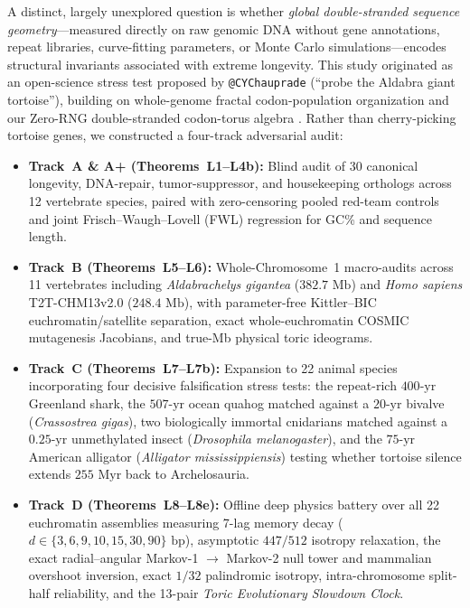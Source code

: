 \documentclass[11pt,a4paper]{article}
\renewcommand{\_}{\origunderscore\penalty200\relax}
\theoremstyle{remark}
\begin{document}
A distinct, largely unexplored question is whether \emph{global double-stranded sequence geometry}---measured directly on raw genomic DNA without gene annotations, repeat libraries, curve-fitting parameters, or Monte Carlo simulations---encodes structural invariants associated with extreme longevity.
This study originated as an open-science stress test proposed by \texttt{@CY\_Chauprade} (``probe the Aldabra giant tortoise''), building on whole-genome fractal codon-population organization \cite{Perez2010} and our Zero-RNG double-stranded codon-torus algebra \cite{LogvinovichPerez2026a,LogvinovichPerez2026b}.
Rather than cherry-picking tortoise genes, we constructed a four-track adversarial audit:
\begin{itemize}
  \item \textbf{Track~A \& A+ (Theorems~L1--L4b):} Blind audit of 30 canonical longevity, DNA-repair, tumor-suppressor, and housekeeping orthologs across 12 vertebrate species, paired with zero-censoring pooled red-team controls and joint Frisch--Waugh--Lovell (FWL) regression for GC\% and sequence length.
  \item \textbf{Track~B (Theorems~L5--L6):} Whole-Chromosome~1 macro-audits across 11 vertebrates including \textit{Aldabrachelys gigantea} ($382.7\text{ Mb}$) and \textit{Homo sapiens} T2T-CHM13v2.0 ($248.4\text{ Mb}$), with parameter-free Kittler--BIC euchromatin/satellite separation, exact whole-euchromatin COSMIC mutagenesis Jacobians, and true-Mb physical toric ideograms.
  \item \textbf{Track~C (Theorems~L7--L7b):} Expansion to 22 animal species incorporating four decisive falsification stress tests: the repeat-rich $400\text{-yr}$ Greenland shark, the $507\text{-yr}$ ocean quahog matched against a $20\text{-yr}$ bivalve (\textit{Crassostrea gigas}), two biologically immortal cnidarians matched against a $0.25\text{-yr}$ unmethylated insect (\textit{Drosophila melanogaster}), and the $75\text{-yr}$ American alligator (\textit{Alligator mississippiensis}) testing whether tortoise silence extends $255\text{ Myr}$ back to Archelosauria.
  \item \textbf{Track~D (Theorems~L8--L8e):} Offline deep physics battery over all 22 euchromatin assemblies measuring 7-lag memory decay ($d \in \{3,6,9,10,15,30,90\}\text{ bp}$), asymptotic $447/512$ isotropy relaxation, the exact radial--angular Markov-1 $\to$ Markov-2 null tower and mammalian overshoot inversion, exact $1/32$ palindromic isotropy, intra-chromosome split-half reliability, and the 13-pair \emph{Toric Evolutionary Slowdown Clock}.
\end{itemize}
\end{document}
